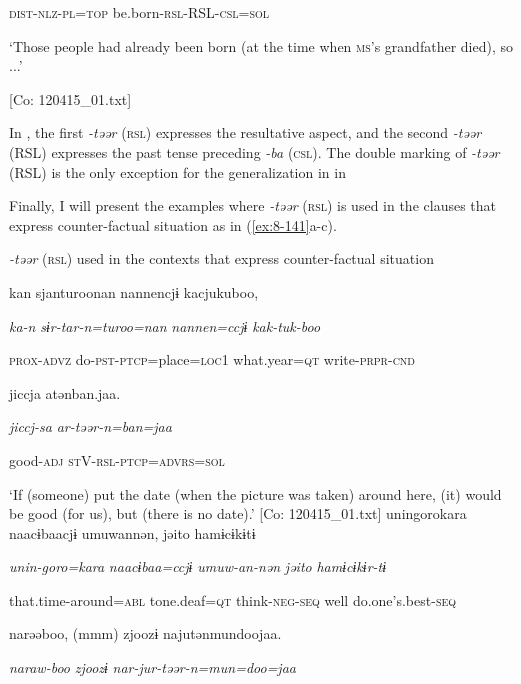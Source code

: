     \textsc{dist}-\textsc{nlz}-\textsc{pl}=\textsc{top}  be.born-\textsc{rsl}-RSL-\textsc{csl}=\textsc{sol}

    ‘Those people had already been born (at the time when \textsc{ms}’s grandfather died), so ...’

    [Co: 120415\_01.txt]
\z

In , the first \textit{{}-təər} (\textsc{rsl}) expresses the resultative aspect, and the second \textit{{}-təər} (RSL) expresses the past tense preceding \textit{-ba} (\textsc{csl}). The double marking of \textit{{}-təər} (RSL) is the only exception for the generalization in  in 

  Finally, I will present the examples where \textit{{}-təər} (\textsc{rsl}) is used in the clauses that express counter-factual situation as in (\ref{ex:8-141}a-c).

\ea\label{ex:8-141}
  \textit{{}-təər} (\textsc{rsl}) used in the contexts that express counter-factual situation

\ea {\TM}
\glll  kan  sjanturoonan  {\textbar}nannen{\textbar}cjɨ  kacjukuboo,

      \textit{ka-n}  \textit{sɨr-tar-n=turoo=nan}  \textit{nannen=ccjɨ}  \textit{kak-tuk-boo}

      \textsc{prox}-\textsc{advz}  do-\textsc{pst}-\textsc{ptcp}=place=\textsc{loc}1  what.year=\textsc{qt}  write-\textsc{prpr}-\textsc{cnd}

      jiccja  atənban.jaa.  

      \textit{jiccj-sa}  \textit{ar-təər{}-n=ban=jaa} 

      good-\textsc{adj}  \textsc{st}V-\textsc{rsl}-\textsc{ptcp}=\textsc{advrs}=\textsc{sol}

\glt ‘If (someone) put the date (when the picture was taken) around here, (it) would be good (for us), but (there is no date).’ [Co: 120415\_01.txt]
\ex {\TM}
\glll  unin{\textbar}goro{\textbar}kara  naacɨbaacjɨ  umuwannən,  jəito  hamɨcɨkɨtɨ

      \textit{unin-goro=kara}  \textit{naacɨbaa=ccjɨ}  \textit{umuw-an-nən}  \textit{jəito}  \textit{hamɨcɨkɨr-tɨ}

      that.time-around=\textsc{abl}  tone.deaf=\textsc{qt}  think-\textsc{neg}-\textsc{seq}  well  do.one’s.best-\textsc{seq}

      narəəboo,  (mmm)  zjoozɨ  najutənmundoojaa.

      \textit{naraw-boo}    \textit{zjoozɨ}  \textit{nar-jur-təər{}-n=mun=doo=jaa}

